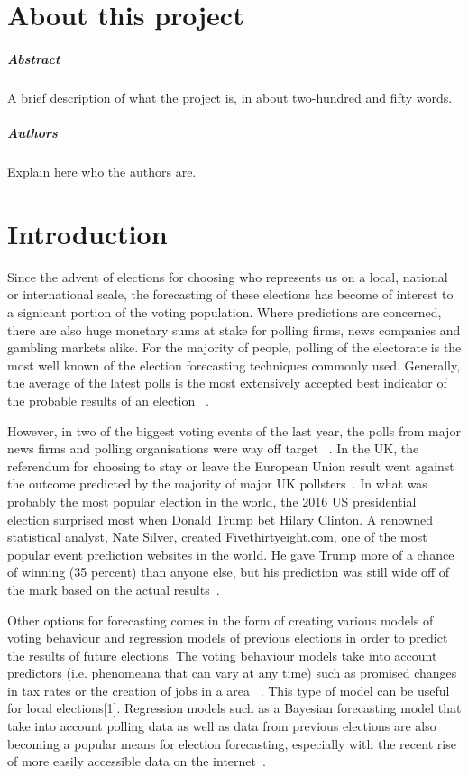
\chapter*{About this project}
\paragraph{Abstract}
A brief description of what the project is, in about two-hundred and fifty words.

\paragraph{Authors}
Explain here who the authors are.



\chapter{Introduction}

Since the advent of elections for choosing who represents us on a local, national or international scale, the forecasting of these elections has become of interest to a signicant portion of the voting population. Where predictions are concerned, there are also huge monetary sums at stake for polling firms, news companies and gambling markets alike. For the majority of  people, polling of the electorate is the most well known of the election forecasting techniques commonly used. Generally,  the average of the latest polls is the most extensively accepted best indicator of the probable results of an election ~\cite{stegmaier}.

However, in two of the biggest voting events of the last year, the polls from major news firms and polling organisations were way off target ~\cite{ukbusinsider}.
In the UK, the referendum for choosing to stay or leave the European Union result went against the outcome predicted by the majority of major UK pollsters~\cite{bbcnews}.
In what was probably the most popular election in the world, the 2016 US presidential election surprised most when Donald Trump bet Hilary Clinton. A renowned statistical analyst, Nate Silver, created Fivethirtyeight.com, one of the most popular event prediction websites in the world. He gave Trump more of a chance of winning (35 percent) than anyone else, but his prediction was still wide off of the mark based on the actual results~\cite{natesilver}.

Other options for forecasting comes in the form of creating various models of voting behaviour and regression models of previous elections in order to predict the results of future elections. The voting behaviour models take into account predictors (i.e. phenomeana that can vary at any time) such as promised changes in tax rates or the creation of jobs in a area ~\cite{stegmaier}. This type of model can be useful for local elections[1]. Regression models such as a Bayesian forecasting model that take into account polling data as well as data from previous elections are also becoming a popular means for election forecasting, especially with the recent rise of more easily accessible data on the internet~\cite{rigdon}.

